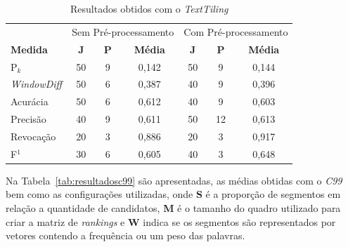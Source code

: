 \begin{table}[!h]
	\centering
	\begin{tabular}{|l||c|c|c||c|c|c|} \hline

		& \multicolumn{3}{c||}{Sem Pré-processamento} 
		& \multicolumn{3}{c|}{Com Pré-processamento}\\			

		\textbf{Medida} & 
		\textbf{J} &
		\textbf{P} & 
		\textbf{Média} &
		\textbf{J} &
		\textbf{P} & 
		\textbf{Média} \\	\hline

		P$_k$				& 50 & 9 & 0,142 & 50 & 9  & 0,144 \\ \hline
		\textit{WindowDiff}	& 50 & 6 & 0,387 & 40 & 9  & 0,396 \\ \hline
		Acurácia			& 50 & 6 & 0,612 & 40 & 9  & 0,603 \\ \hline
		Precisão			& 40 & 9 & 0,611 & 50 & 12 & 0,613 \\ \hline
		Revocação			& 20 & 3 & 0,886 & 20 & 3  & 0,917 \\ \hline
		F$^1$				& 30 & 6 & 0,605 & 40 & 3  & 0,648 \\ \hline

	\end{tabular}
	\caption{Resultados obtidos com o \textit{TextTiling}}
	\label{tab:resultadosTT}
\end{table}




Na Tabela~\ref{tab:resultadosc99} são apresentadas, as médias obtidas com o \textit{C99} bem como as configurações utilizadas, onde \textbf{S} é a proporção de segmentos em relação a quantidade de candidatos, \textbf{M} é o tamanho do quadro utilizado para criar a matriz de \textit{rankings} e \textbf{W} indica se os segmentos são representados por vetores contendo a frequência ou um peso das palavras.


